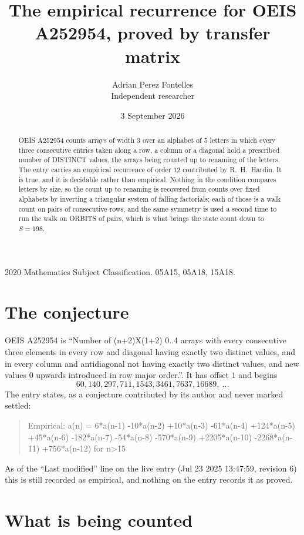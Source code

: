 \documentclass[11pt,a4paper]{article}
\title{The empirical recurrence for OEIS A252954, proved by transfer matrix}
\author{Adrian Perez Fontelles\\ \small Independent researcher}
\date{3 September 2026}
\theoremstyle{plain}
\theoremstyle{definition}
\begin{document}
\maketitle

\begin{abstract}
OEIS A252954 counts arrays of width $3$ over an alphabet of $5$ letters in which every three
consecutive entries taken along a row, a column or a diagonal hold a prescribed number of
DISTINCT values, the arrays being counted up to renaming of the letters. The entry carries an
empirical recurrence of order $12$ contributed by R.~H.~Hardin. It is true, and it is
decidable rather than empirical. Nothing in the condition compares letters by size, so the
count up to renaming is recovered from counts over fixed alphabets by inverting a triangular
system of falling factorials; each of those is a walk count on pairs of consecutive rows, and
the same symmetry is used a second time to run the walk on ORBITS of pairs, which is what
brings the state count down to $S=198$.
\end{abstract}

\noindent\small 2020 Mathematics Subject Classification. 05A15, 05A18, 15A18.\normalsize

\section{The conjecture}

OEIS A252954 is ``Number of (n+2)X(1+2) 0..4 arrays with every consecutive three elements in every row and diagonal having exactly two distinct values, and in every column and antidiagonal not having exactly two distinct values, and new values 0 upwards introduced in row major order.''. It has offset $1$ and begins
\[
60, 140, 297, 711, 1543, 3461, 7637, 16689,\ \dots
\]
The entry states, as a conjecture contributed by its author and never marked settled:
\begin{quote}
Empirical: a(n) = 6*a(n-1) -10*a(n-2) +10*a(n-3) -61*a(n-4) +124*a(n-5) +45*a(n-6) -182*a(n-7) -54*a(n-8) -570*a(n-9) +2205*a(n-10) -2268*a(n-11) +756*a(n-12) for n>15
\end{quote}
As of the ``Last modified'' line on the live entry (Jul 23 2025 13:47:59, revision 6) this is still
recorded as empirical, and nothing on the entry records it as proved.

\section{What is being counted}
\end{document}
